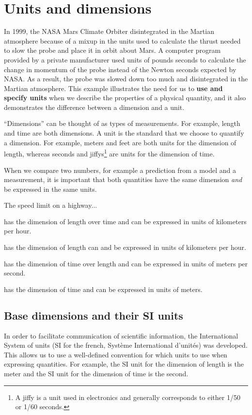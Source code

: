 \section{Units and dimensions}
In 1999, the NASA Mars Climate Orbiter disintegrated in the Martian atmosphere because of a mixup in the units used to calculate the thrust needed to slow the probe and place it in orbit about Mars. A computer program provided by a private manufacturer used units of pounds seconds to calculate the change in momentum of the probe instead of the Newton seconds expected by NASA. As a result, the probe was slowed down too much and disintegrated in the Martian atmosphere. This example illustrates the need for us to \textbf{use and specify units} when we describe the properties of a physical quantity, and it also demonstrates the difference between a dimension and a unit.

``Dimensions'' can be thought of as types of measurements. For example, length and time are both dimensions. A unit is the standard that we choose to quantify a dimension. For example, meters and feet are both units for the dimension of length, whereas seconds and jiffys\footnote{A jiffy is a unit used in electronics and generally corresponds to either 1/50 or 1/60 seconds.} are units for the dimension of time.

When we compare two numbers, for example a prediction from a model and a measurement, it is important that both quantities have the same dimension \textit{and} be expressed in the same units.
\begin{checkpoint}
\begin{MCquestion}{The speed limit on a highway...}
\item has the dimension of length over time and can be expressed in units of kilometers per hour. \correct
\item has the dimension of length can and be expressed in units of kilometers per hour.
\item has the dimension of time over length and can be expressed in units of meters per second.
\item has the dimension of time and can be expressed in units of meters.
\end{MCquestion}
\end{checkpoint}

\subsection{Base dimensions and their SI units}
In order to facilitate communication of scientific information, the International System of units (SI for the french, Syst\`eme International d'unit\'es) was developed. This allows us to use a well-defined convention for which units to use when expressing quantities. For example, the SI unit for the dimension of length is the meter and the SI unit for the dimension of time is the second.

